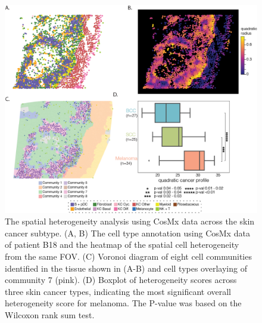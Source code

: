 \begin{figure}
    \centering
    \includegraphics[width=0.8\columnwidth]{Chapter4/Figures/Chap4_figure_2.png}
    \caption[The spatial heterogeneity analysis using CosMx data across the skin cancer subtype]{The spatial heterogeneity analysis using CosMx data across the skin cancer subtype. (A, B) The cell type annotation using CosMx data of patient B18 and the heatmap of the spatial cell heterogeneity from the same FOV. (C) Voronoi diagram of eight cell communities identified in the tissue shown in (A-B) and cell types overlaying of community 7 (pink). (D) Boxplot of heterogeneity scores across three skin cancer types, indicating the most significant overall heterogeneity score for melanoma. The P-value was based on the Wilcoxon rank sum test. }
    \label{Chap4:fig1}
    
\end{figure}


